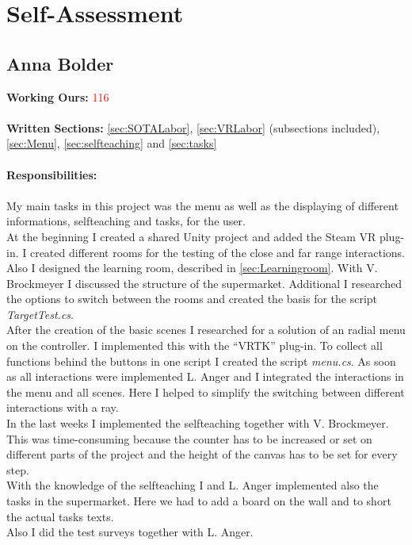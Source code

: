 \section{Self-Assessment} \label{sec:SA}


\subsection{Anna Bolder} \label{sec:SAAnna}

\textbf{Working Ours:} \textcolor{red}{116} \\ \\
\textbf{Written Sections:} \ref{sec:SOTALabor},  \ref{sec:VRLabor} (subsections included), \ref{sec:Menu}, \ref{sec:selfteaching} and \ref{sec:tasks} \\ \\
\textbf{Responsibilities:}\\ \\
My main tasks in this project was the menu as well as the displaying of different informations, selfteaching and tasks, for the user. \\
At the beginning I created a shared Unity project and added the Steam VR plug-in. I created different rooms for the testing of the close and far range interactions. Also I designed the learning room, described in \ref{sec:Learningroom}. With V. Brockmeyer I discussed the structure of the supermarket. Additional I researched the options to switch between the rooms and created the basis for the script \textit{TargetTest.cs}.\\
After the creation of the basic scenes I researched for a solution of an radial menu on the controller. I implemented this with the ``VRTK'' plug-in. To collect all functions behind the buttons in one script I created the script \textit{menu.cs}.
As soon as all interactions were implemented L. Anger and I integrated the interactions in the menu and all scenes. Here I helped to simplify the switching between different interactions with a ray. \\
In the last weeks I implemented the selfteaching together with V. Brockmeyer. This was time-consuming because the counter has to be increased or set on different parts of the project and the height of the canvas has to be set for every step.\\
With the knowledge of the selfteaching I and L. Anger implemented also the tasks in the supermarket. Here we had to add a board on the wall and to short the actual tasks texts. \\
Also I did the test surveys together with L. Anger.\\

